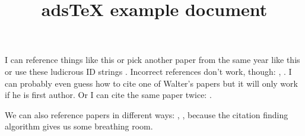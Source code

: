 \documentclass[10pt,a4paper]{article}
\begin{document}
\title{adsTeX example document}
\maketitle
I can reference things like this \cite{THands2014MNRAS} or pick another paper from the same year like this \cite{THands2014IAUS} or use these ludicrous ID strings \citep{2014MNRAS.445.2285D}. Incorrect references don't work, though: \cite{MBlobbyNEdmonds1990}, \cite{3123MNRAS.123.123D}. I can probably even guess how to cite one of Walter's papers \citep{WDehnen2000MNRAS} but it will only work if he is first author. Or I can cite the same paper twice: \cite{THands2014MNRAS}.

We can also reference papers in different ways: \cite{rein2009A&A}, \cite{Swift2013ApJ}, because the citation finding algorithm gives us some breathing room.

\end{document}
